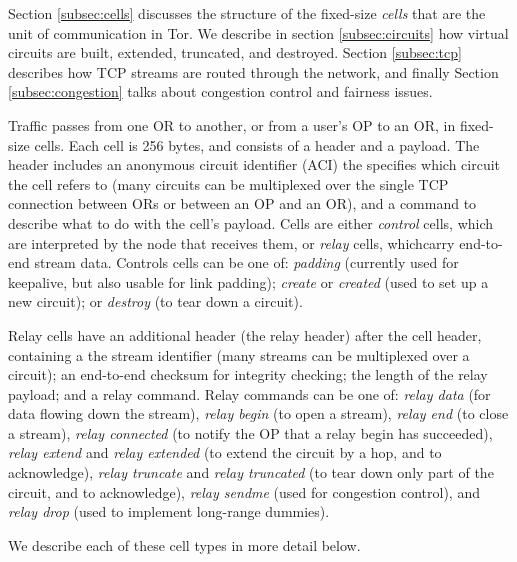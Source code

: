 \documentclass[times,10pt,twocolumn]{article}
\begin{document}
Section \ref{subsec:cells} discusses the structure of the fixed-size
\emph{cells} that are the unit of communication in Tor. We describe
in section \ref{subsec:circuits} how virtual circuits are
built, extended, truncated, and destroyed. Section \ref{subsec:tcp}
describes how TCP streams are routed through the network, and finally
Section \ref{subsec:congestion} talks about congestion control and
fairness issues.

\label{subsec:cells}


Traffic passes from one OR to another, or from a user's OP to an OR,
in fixed-size cells. Each cell is 256
bytes, and consists of a header and a payload. The header includes an
anonymous circuit identifier (ACI) the specifies which circuit the
cell refers to
(many circuits can be multiplexed over the single TCP connection between
ORs or between an OP and an OR), and a command to describe what to do
with the cell's payload. Cells are either \emph{control} cells, which are
interpreted by the node that receives them, or \emph{relay} cells,
whichcarry end-to-end stream data. Controls cells can be one of:
\emph{padding} (currently used for keepalive, but also usable for link
padding); \emph{create} or \emph{created} (used to set up a new circuit);
or \emph{destroy} (to tear down a circuit).

Relay cells have an additional header (the relay header) after the
cell header, containing a the stream identifier (many streams can
be multiplexed over a circuit); an end-to-end checksum for integrity
checking; the length of the relay payload; and a relay command. Relay
commands can be one of: \emph{relay
data} (for data flowing down the stream), \emph{relay begin} (to open a
stream), \emph{relay end} (to close a stream), \emph{relay connected}
(to notify the OP that a relay begin has succeeded), \emph{relay
extend} and \emph{relay extended} (to extend the circuit by a hop,
and to acknowledge), \emph{relay truncate} and \emph{relay truncated}
(to tear down only part of the circuit, and to acknowledge), \emph{relay
sendme} (used for congestion control), and \emph{relay drop} (used to
implement long-range dummies).

We describe each of these cell types in more detail below.

\end{document}
